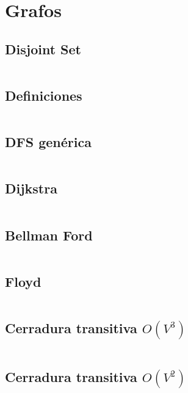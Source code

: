\documentclass[11pt]{article}
\begin{document}
	\newpage
	\section{Grafos}
		\subsection{Disjoint Set}
		\inputminted[tabsize=2,breaklines,firstline=8,lastline=37,fontsize=\small]{c++}{graph.cpp}
		
		\subsection{Definiciones}
		\inputminted[tabsize=2,breaklines,firstline=39,lastline=100,fontsize=\small]{c++}{graph.cpp}
		
		\subsection{DFS genérica}
		\inputminted[tabsize=2,breaklines,firstline=411,lastline=429,fontsize=\small]{c++}{graph.cpp}
		
		\subsection{Dijkstra}
		\inputminted[tabsize=2,breaklines,firstline=102,lastline=125,fontsize=\small]{c++}{graph.cpp}
		
		\subsection{Bellman Ford}
		\inputminted[tabsize=2,breaklines,firstline=127,lastline=161,fontsize=\small]{c++}{graph.cpp}
		
		\subsection{Floyd}
		\inputminted[tabsize=2,breaklines,firstline=167,lastline=175,fontsize=\small]{c++}{graph.cpp}
		
		\subsection{Cerradura transitiva $O(V^3)$}
		\inputminted[tabsize=2,breaklines,firstline=177,lastline=184,fontsize=\small]{c++}{graph.cpp}
		
		\subsection{Cerradura transitiva $O(V^2)$}
		\inputminted[tabsize=2,breaklines,firstline=186,lastline=200,fontsize=\small]{c++}{graph.cpp}
		
\end{document}
